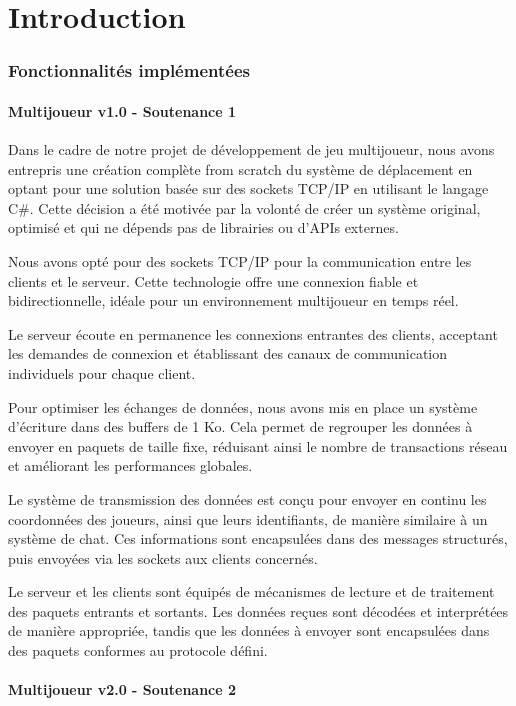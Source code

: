 \documentclass[
	article,			%
	11pt,				%
	oneside,			%
	a4paper,			%
	chapter=TITLE,
	french,			%
	sumario=tradicional
	]{base_nt}
\begin{document}
\part{Introduction}
\section{Fonctionnalités implémentées}

\subsection{Multijoueur v1.0 - Soutenance 1}

Dans le cadre de notre projet de développement de jeu multijoueur, nous avons entrepris une création complète from scratch du système de déplacement en optant pour une solution basée sur des sockets TCP/IP en utilisant le langage C\#. Cette décision a été motivée par la volonté de créer un système original, optimisé et qui ne dépends pas de librairies ou d'APIs externes.

Nous avons opté pour des sockets TCP/IP pour la communication entre les clients et le serveur. Cette technologie offre une connexion fiable et bidirectionnelle, idéale pour un environnement multijoueur en temps réel.

Le serveur écoute en permanence les connexions entrantes des clients, acceptant les demandes de connexion et établissant des canaux de communication individuels pour chaque client.

Pour optimiser les échanges de données, nous avons mis en place un système d'écriture dans des buffers de 1 Ko. Cela permet de regrouper les données à envoyer en paquets de taille fixe, réduisant ainsi le nombre de transactions réseau et améliorant les performances globales.

Le système de transmission des données est conçu pour envoyer en continu les coordonnées des joueurs, ainsi que leurs identifiants, de manière similaire à un système de chat. Ces informations sont encapsulées dans des messages structurés, puis envoyées via les sockets aux clients concernés.

Le serveur et les clients sont équipés de mécanismes de lecture et de traitement des paquets entrants et sortants. Les données reçues sont décodées et interprétées de manière appropriée, tandis que les données à envoyer sont encapsulées dans des paquets conformes au protocole défini.

\newpage

\subsection{Multijoueur v2.0 - Soutenance 2}
\end{document}
